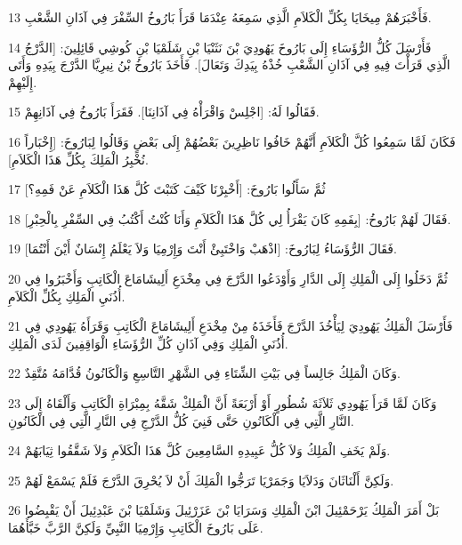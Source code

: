 \par 13 فَأَخْبَرَهُمْ مِيخَايَا بِكُلِّ الْكَلاَمِ الَّذِي سَمِعَهُ عِنْدَمَا قَرَأَ بَارُوخُ السِّفْرَ فِي آذَانِ الشَّعْبِ.
\par 14 فَأَرْسَلَ كُلُّ الرُّؤَسَاءِ إِلَى بَارُوخَ يَهُودِيَ بْنَ نَثَنْيَا بْنِ شَلَمْيَا بْنِ كُوشِي قَائِلِينَ: [الدَّرْجُ الَّذِي قَرَأْتَ فِيهِ فِي آذَانِ الشَّعْبِ خُذْهُ بِيَدِكَ وَتَعَالَ]. فَأَخَذَ بَارُوخُ بْنُ نِيرِيَّا الدَّرْجَ بِيَدِهِ وَأَتَى إِلَيْهِمْ.
\par 15 فَقَالُوا لَهُ: [اجْلِسْ وَاقْرَأْهُ فِي آذَانِنَا]. فَقَرَأَ بَارُوخُ فِي آذَانِهِمْ.
\par 16 فَكَانَ لَمَّا سَمِعُوا كُلَّ الْكَلاَمِ أَنَّهُمْ خَافُوا نَاظِرِينَ بَعْضُهُمْ إِلَى بَعْضٍ وَقَالُوا لِبَارُوخَ: [إِخْبَاراً نُخْبِرُ الْمَلِكَ بِكُلِّ هَذَا الْكَلاَمِ].
\par 17 ثُمَّ سَأَلُوا بَارُوخَ: [أَخْبِرْنَا كَيْفَ كَتَبْتَ كُلَّ هَذَا الْكَلاَمِ عَنْ فَمِهِ؟]
\par 18 فَقَالَ لَهُمْ بَارُوخُ: [بِفَمِهِ كَانَ يَقْرَأُ لِي كُلَّ هَذَا الْكَلاَمِ وَأَنَا كُنْتُ أَكْتُبُ فِي السِّفْرِ بِالْحِبْرِ].
\par 19 فَقَالَ الرُّؤَسَاءُ لِبَارُوخَ: [اذْهَبْ وَاخْتَبِئْ أَنْتَ وَإِرْمِيَا وَلاَ يَعْلَمُ إِنْسَانٌ أَيْنَ أَنْتُمَا].
\par 20 ثُمَّ دَخَلُوا إِلَى الْمَلِكِ إِلَى الدَّارِ وَأَوْدَعُوا الدَّرْجَ فِي مِخْدَعِ أَلِيشَامَاعَ الْكَاتِبِ وَأَخْبَرُوا فِي أُذُنَيِ الْمَلِكِ بِكُلِّ الْكَلاَمِ.
\par 21 فَأَرْسَلَ الْمَلِكُ يَهُودِيَ لِيَأْخُذَ الدَّرْجَ فَأَخَذَهُ مِنْ مِخْدَعِ أَلِيشَامَاعَ الْكَاتِبِ وَقَرَأَهُ يَهُودِي فِي أُذُنَيِ الْمَلِكِ وَفِي آذَانِ كُلِّ الرُّؤَسَاءِ الْوَاقِفِينَ لَدَى الْمَلِكِ.
\par 22 وَكَانَ الْمَلِكُ جَالِساً فِي بَيْتِ الشِّتَاءِ فِي الشَّهْرِ التَّاسِعِ وَالْكَانُونُ قُدَّامَهُ مُتَّقِدٌ.
\par 23 وَكَانَ لَمَّا قَرَأَ يَهُودِي ثَلاَثَةَ شُطُورٍ أَوْ أَرْبَعَةً أَنَّ الْمَلِكْ شَقَّهُ بِمِبْرَاةِ الْكَاتِبِ وَأَلْقَاهُ إِلَى النَّارِ الَّتِي فِي الْكَانُونِ حَتَّى فَنِيَ كُلُّ الدَّرْجِ فِي النَّارِ الَّتِي فِي الْكَانُونِ.
\par 24 وَلَمْ يَخَفِ الْمَلِكُ وَلاَ كُلُّ عَبِيدِهِ السَّامِعِينَ كُلَّ هَذَا الْكَلاَمِ وَلاَ شَقَّقُوا ثِيَابَهُمْ.
\par 25 وَلَكِنَّ أَلْنَاثَانَ وَدَلاَيَا وَجَمَرْيَا تَرَجُّوا الْمَلِكَ أَنْ لاَ يُحْرِقَ الدَّرْجَ فَلَمْ يَسْمَعْ لَهُمْ.
\par 26 بَلْ أَمَرَ الْمَلِكُ يَرْحَمْئِيلَ ابْنَ الْمَلِكِ وَسَرَايَا بْنَ عَزَرْئِيلَ وَشَلَمْيَا بْنَ عَبْدِئِيلَ أَنْ يَقْبِضُوا عَلَى بَارُوخَ الْكَاتِبِ وَإِرْمِيَا النَّبِيِّ وَلَكِنَّ الرَّبَّ خَبَّأَهُمَا.
